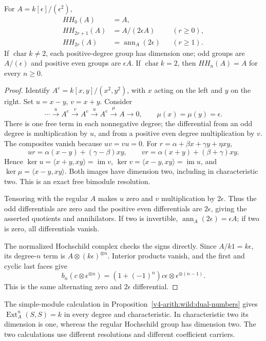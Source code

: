 \begin{proposition}
\label{v4-arith:wild:HH-dual-numbers}
For \(A=k[\epsilon]/(\epsilon^2)\),
\begin{align*}
 HH_0(A)&=A,\\
 HH_{2r+1}(A)&=A/(2\epsilon A) &&(r\ge0),\\
 HH_{2r}(A)&=\operatorname{ann}_A(2\epsilon) &&(r\ge1).
\end{align*}
If \(\operatorname{char}k\ne2\), each positive-degree group has
dimension one; odd groups are \(A/(\epsilon)\) and positive even
groups are \(\epsilon A\). If \(\operatorname{char}k=2\), then
\(HH_n(A)=A\) for every \(n\ge0\).
\end{proposition}
\begin{proof}
Identify \(A^e=k[x,y]/(x^2,y^2)\), with \(x\) acting on the left
and \(y\) on the right. Set \(u=x-y\), \(v=x+y\). Consider
\[
 \cdots\xrightarrow{u}A^e\xrightarrow{v}A^e
 \xrightarrow{u}A^e\xrightarrow{\mu}A\longrightarrow0,
 \qquad \mu(x)=\mu(y)=\epsilon.
\]
There is one free term in each nonnegative degree; the differential
from an odd degree is multiplication by \(u\), and from a positive
even degree multiplication by \(v\). The composites vanish because
\(uv=vu=0\). For \(r=\alpha+\beta x+\gamma y+\eta xy\),
\[
 ur=\alpha(x-y)+(\gamma-\beta)xy,\qquad
 vr=\alpha(x+y)+(\beta+\gamma)xy.
\]
Hence \(\ker u=\langle x+y,xy\rangle=\operatorname{im}v\),
\(\ker v=\langle x-y,xy\rangle=\operatorname{im}u\), and
\(\ker\mu=\langle x-y,xy\rangle\). Both images have dimension
two, including in characteristic two. This is an exact free
bimodule resolution.

Tensoring with the regular \(A\) makes \(u\) zero and \(v\)
multiplication by \(2\epsilon\). Thus the odd differentials are
zero and the positive even differentials are \(2\epsilon\), giving
the asserted quotients and annihilators. If two is invertible,
\(\operatorname{ann}_A(2\epsilon)=\epsilon A\); if two is zero,
all differentials vanish.

The normalized Hochschild complex checks the signs directly.
Since \(A/k1=k\epsilon\), its degree-\(n\) term is
\(A\otimes(k\epsilon)^{\otimes n}\). Interior products vanish,
and the first and cyclic last faces give
\[
 b_n(c\otimes\epsilon^{\otimes n})
  =(1+(-1)^n)c\epsilon\otimes\epsilon^{\otimes(n-1)}.
\]
This is the same alternating zero and \(2\epsilon\) differential.
\end{proof}

The simple-module calculation in
Proposition~\ref{v4-arith:wild:dual-numbers} gives
\(\operatorname{Ext}^n_A(S,S)=k\) in every degree and characteristic.
In characteristic two its dimension is one, whereas the regular
Hochschild group has dimension two. The two calculations use
different resolutions and different coefficient carriers.

